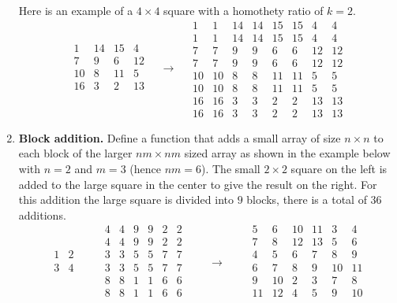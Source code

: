\documentclass[11pt,class=report,crop=false]{standalone}
\begin{document}
\begin{activite}
\begin{enumerate}
Here is an example of a $4\times 4$ square with a homothety ratio of $k=2$.
$$  
  \begin{array}{c|c|c|c}  
  1& 14& 15& 4\\\hline
  7& 9& 6& 12\\\hline
  10& 8& 11& 5\\\hline
  16& 3& 2& 13\\    
  \end{array} 
\quad  \longrightarrow \quad 
  \begin{array}{cc|cc|cc|cc}
 1& 1&14&14&15&15& 4& 4\\
  1& 1&14&14&15&15& 4& 4\\\hline
  7& 7& 9& 9& 6& 6&12&12\\
  7& 7& 9& 9& 6& 6&12&12\\\hline
 10&10& 8& 8&11&11& 5& 5\\
 10&10& 8& 8&11&11& 5& 5\\\hline
 16&16& 3& 3& 2& 2&13&13\\
 16&16& 3& 3& 2& 2&13&13
 \end{array}
  $$
  
\item \textbf{Block addition.} Define a  function that adds a small array of size $n \times n$ to each block of the larger $nm \times nm$ sized array as shown in the example below with $n=2$ and $m=3$ (hence $nm=6$). The small $2 \times 2$ square on the left is added to the large square in the center to give the result on the right. For this addition the large square is divided into $9$ blocks, there is a total of $36$ additions.
$$
  \begin{array}{cc} 
  1& 2  \\
  3& 4  \\
  \end{array}
  \qquad
  \begin{array}{cc|cc|cc}  
  4& 4& 9& 9& 2& 2  \\
  4& 4& 9& 9& 2& 2  \\\hline
  3& 3& 5& 5& 7& 7  \\
  3& 3& 5& 5& 7& 7  \\\hline
  8& 8& 1& 1& 6& 6  \\
  8& 8& 1& 1& 6& 6  \\
  \end{array}
  \qquad  \longrightarrow \qquad
  \begin{array}{cc|cc|cc}
  5& 6&10&11& 3& 4  \\
  7& 8&12&13& 5& 6  \\\hline
  4& 5& 6& 7& 8& 9  \\
  6& 7& 8& 9&10&11  \\\hline
  9&10& 2& 3& 7& 8  \\
 11&12& 4& 5& 9&10  \\
  \end{array}
$$


\end{enumerate}
\end{activite}
\end{document}
